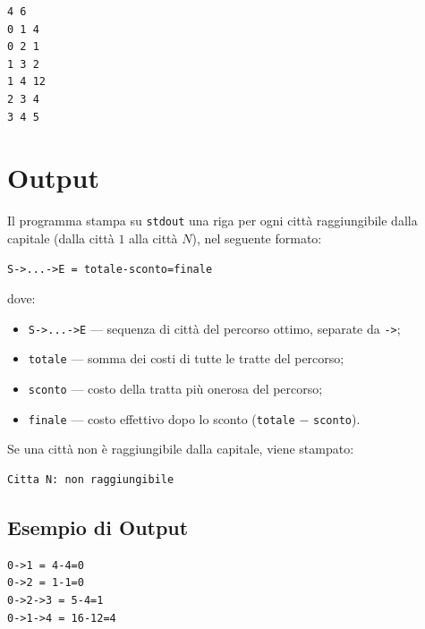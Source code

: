 \begin{lstlisting}
4 6
0 1 4
0 2 1
1 3 2
1 4 12
2 3 4
3 4 5
\end{lstlisting}

\section{Output}

Il programma stampa su \texttt{stdout} una riga per ogni città 
raggiungibile dalla capitale (dalla città $1$ alla città $N$), 
nel seguente formato:

\begin{lstlisting}
S->...->E = totale-sconto=finale
\end{lstlisting}

dove:
\begin{itemize}
    \item \texttt{S->...->E} --- sequenza di città del percorso ottimo, 
    separate da \texttt{->};
    \item \texttt{totale} --- somma dei costi di tutte le tratte 
    del percorso;
    \item \texttt{sconto} --- costo della tratta più onerosa del percorso;
    \item \texttt{finale} --- costo effettivo dopo lo sconto 
    (\texttt{totale} $-$ \texttt{sconto}).
\end{itemize}

Se una città non è raggiungibile dalla capitale, viene stampato:

\begin{lstlisting}
Citta N: non raggiungibile
\end{lstlisting}

\subsection{Esempio di Output}

\begin{lstlisting}
0->1 = 4-4=0
0->2 = 1-1=0
0->2->3 = 5-4=1
0->1->4 = 16-12=4
\end{lstlisting}